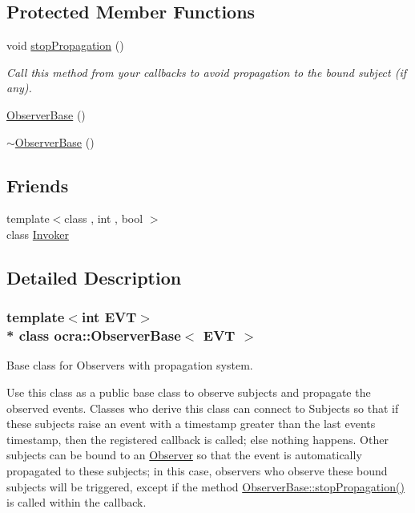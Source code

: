 \subsection*{Protected Member Functions}
\begin{DoxyCompactItemize}
\item 
void \hyperlink{classocra_1_1ObserverBase_ace47225f3ec0cf9985a885b0a95588e0}{stop\+Propagation} ()
\begin{DoxyCompactList}\small\item\em Call this method from your callbacks to avoid propagation to the bound subject (if any). \end{DoxyCompactList}\end{DoxyCompactItemize}
{\bf }\par
\begin{DoxyCompactItemize}
\item 
\hyperlink{classocra_1_1ObserverBase_aafa4d4e56d4849a38915b4803d869a8f}{Observer\+Base} ()
\item 
\hyperlink{classocra_1_1ObserverBase_ac7da945b97ccdbb8fdcff20ec38541da}{$\sim$\+Observer\+Base} ()
\end{DoxyCompactItemize}

\subsection*{Friends}
\begin{DoxyCompactItemize}
\item 
{\footnotesize template$<$class , int , bool $>$ }\\class \hyperlink{classocra_1_1ObserverBase_a63f148e01d4fc8e06b665e920abe3794}{Invoker}
\end{DoxyCompactItemize}


\subsection{Detailed Description}
\subsubsection*{template$<$int E\+VT$>$\\*
class ocra\+::\+Observer\+Base$<$ E\+V\+T $>$}

Base class for Observers with propagation system. 

Use this class as a public base class to observe subjects and propagate the observed events. Classes who derive this class can connect to Subjects so that if these subjects raise an event with a timestamp greater than the last event\textquotesingle{}s timestamp, then the registered callback is called; else nothing happens. Other subjects can be bound to an \hyperlink{classocra_1_1Observer}{Observer} so that the event is automatically propagated to these subjects; in this case, observers who observe these bound subjects will be triggered, except if the method \hyperlink{classocra_1_1ObserverBase_ace47225f3ec0cf9985a885b0a95588e0}{Observer\+Base\+::stop\+Propagation()} is called within the callback.


